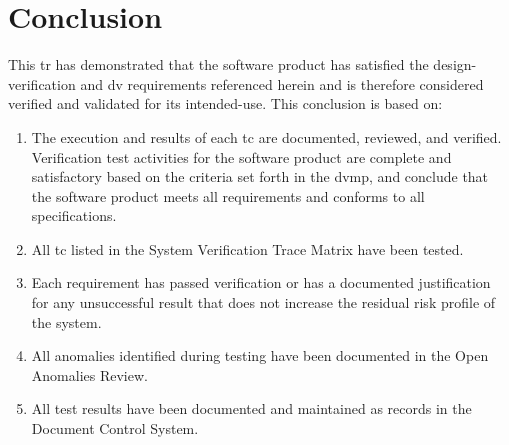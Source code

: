 \newpage
\section{Conclusion}
This \gls{tr} has demonstrated that the software product has satisfied the
\gls{design-verification} and \gls{dv} requirements referenced
herein and is therefore considered verified and validated for its
\gls{intended-use}.
This conclusion is based on:

\begin{enumerate} 
  \item The execution and results of each \gls{tc} are documented, reviewed, and
    verified. Verification test activities for the software product are complete and
    satisfactory based on the criteria set forth in the \gls{dvmp}, and conclude
    that the software product meets all requirements and conforms to all
    specifications.

  \item All \gls{tc} listed in the System Verification Trace Matrix have been
    tested. 

  \item Each requirement has passed verification or has a documented
    justification for any unsuccessful result that does not increase the residual
    risk profile of the system.

  \item All anomalies identified during testing have been documented in the Open
    Anomalies Review.

  \item All test results have been documented and maintained as records in the
    Document Control System.

\end{enumerate}
